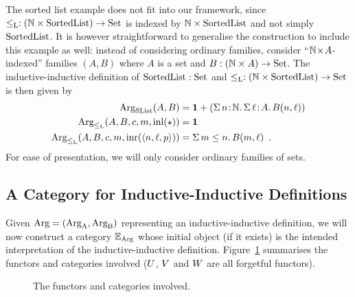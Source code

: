 \documentclass[orivec,envcountsame, ,envcountsect]{llncs}
\begin{document}
\begin{example}
\label{ex:SList-functor}
The sorted list example does not fit into our framework, since
$\leq_{\text{L}} : (\mathbb{N} \times \text{SortedList}) \to \text{Set}$ is indexed by $\mathbb{N}
\times \text{SortedList}$ and not simply $\text{SortedList}$. It is however
straightforward to generalise the construction to include this example
as well: instead of considering ordinary families, consider
``${\mathbb{N}\!\times\!A }$-indexed'' families $(A, B)$ where $A$ is a set
and $B : (\mathbb{N} \times A) \to \text{Set}$.  The inductive-inductive
definition of $\text{SortedList} : \text{Set}$ and $\leq_{\text{L}} : (\mathbb{N} \times
\text{SortedList}) \to \text{Set}$ is then given by
\begin{align*}
  \text{Arg}_{\text{SList}}(A, B) &= \mathbf{1} + (\Sigma\, n\!:\!\mathbb{N} .\,\Sigma\,\ell\!:\!A.\, B(n,\ell))\\
  \text{Arg}_{\leq_{\text{L}}}(A, B, c, m, \text{inl}(\star)) &= \mathbf{1} \\
  \text{Arg}_{\leq_{\text{L}}}(A, B, c, m, \text{inr}(\langle n, \ell, p\rangle)) &= \Sigma\,m \leq n.\, B(m, \ell) \enspace .
\end{align*}
For ease of presentation, we will only consider ordinary families of
sets.

\end{example}


\subsection{A Category for Inductive-Inductive Definitions}

Given $\text{Arg} = (\text{Arg}_{\text{A}}, \text{Arg}_{\text{B}})$ representing an inductive-inductive
definition, we will now construct a category $\mathbb{E}_{\text{Arg}}$
whose initial object (if it exists) is the intended interpretation of
the inductive-inductive definition. Figure~\ref{fig:map-of-functors}
summarises the functors and categories involved ($U$,
$V$ and $W$ are all forgetful functors).

\begin{figure}
  \centering
  \caption{The functors and categories involved.}
  \label{fig:map-of-functors}
\end{figure}
\end{document}

